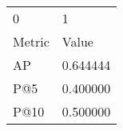 \begin{tabular}{ll}
0 & 1 \\
Metric & Value \\
AP & 0.644444 \\
P@5 & 0.400000 \\
P@10 & 0.500000 \\
\end{tabular}
